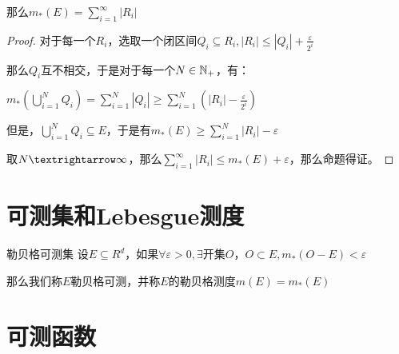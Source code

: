 \documentclass[12pt, a4paper, oneside, UTF8]{ctexbook}
\begin{document}
\begin{para}{0}
\begin{proposition}
					那么$m_*(E) = \sum\limits_{i=1}^{\infty} |R_i|$
				\end{proposition}
				\begin{proof}
					对于每一个$R_i$，选取一个闭区间$Q_i \subseteq R_i,|R_i| \leqslant |Q_i| + \frac{\varepsilon}{2^i}$
					
					那么$Q_i$互不相交，于是对于每一个$N \in \mathbb{N}_+$，有：
					
					$m_*(\bigcup\limits_{i=1}^{N} Q_i)=\sum\limits_{i=1}^{N} |Q_i| \geqslant \sum\limits_{i=1}^{N} \left(|R_i| - \frac{\varepsilon}{2^i}\right)$
					
					但是，$\bigcup\limits_{i=1}^{N} Q_i \subseteq E$，于是有$m_*(E) \geqslant \sum\limits_{i=1}^{N} |R_i| - \varepsilon$
					
					取$N \textrightarrow \infty$，那么$\sum\limits_{i=1}^{\infty} |R_i| \leqslant  m_*(E)+\varepsilon$，那么命题得证。
				\end{proof}
		\end{para}
	\section{可测集和Lebesgue测度}
		\begin{defn}{勒贝格可测集}{}
			设$E \subseteq R^d$，如果$\forall \varepsilon > 0,\exists$开集$O$，$O \subset E,m_*(O-E) < \varepsilon$
			
			那么我们称$E$勒贝格可测，并称$E$的勒贝格测度$m(E)=m_*(E)$
		\end{defn}
	\section{可测函数}
\ifx\allfiles\undefined
\end{document}
